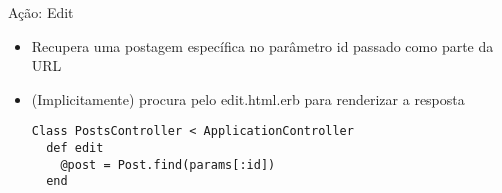 \begin{frame}[t, fragile]{Ação: Edit}
	\begin{itemize}
		\item Recupera uma postagem específica no parâmetro \alert{id} passado como parte da URL
		\item (Implicitamente) procura pelo \alert{edit.html.erb} para renderizar a resposta
		\begin{lstlisting}[style=RubyInputStyle, caption=controllers/posts\_controller.rb]
Class PostsController < ApplicationController
  def edit 
    @post = Post.find(params[:id])
  end 
		\end{lstlisting}		
	\end{itemize}	
\end{frame}